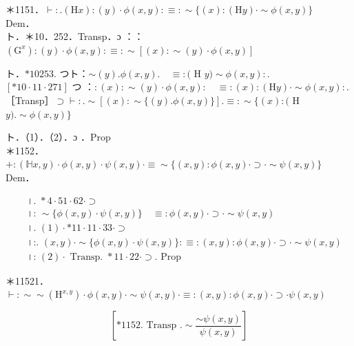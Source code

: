 \documentclass[10pt]{article}
\begin{document}
＊1151．$\vdash: .(\mathrm{H} x):(y) \cdot \phi(x, y): \equiv: \sim\{(x):(\mathrm{H} y) \cdot \sim \phi(x, y)\}$\\
Dem．\\
ト．＊10．252．Transp．ɔ ：：$\left(\mathrm{G}^{x}\right):(y) \cdot \phi(x, y): \equiv: \sim[(x): \sim(y) \cdot \phi(x, y)]$

ト．$* 10253$. つト：$\sim(y) . \phi(x, y) . \quad \equiv:($ H $y) \sim \phi(x, y):$.\\
$[* 10 \cdot 11 \cdot 271]$ つ ：$:(x): \sim(y) \cdot \phi(x, y): \quad \equiv:(x):(\mathrm{H} y) \cdot \sim \phi(x, y):$.\\
［Transp］$\supset \vdash: . \sim[(x): \sim\{(y) . \phi(x, y)\}] . \equiv: \sim\{(x):($ H $y) . \sim \phi(x, y)\}$

ト．（1）．（2）．ɔ ．Prop\\
＊1152．$+:(\mathbb{H} x, y) \cdot \phi(x, y) \cdot \psi(x, y) \cdot \equiv \sim\{(x, y): \phi(x, y) \cdot \supset \cdot \sim \psi(x, y)\}$\\
Dem．


\begin{align*}
& \text { ।. } * 4 \cdot 51 \cdot 62 \cdot \supset \\
& \text { ।: } \sim\{\phi(x, y) \cdot \psi(x, y)\} \quad \equiv: \phi(x, y) \cdot \supset \cdot \sim \psi(x, y)  \tag{1}\\
& \text { ।. }(1) \cdot * 11 \cdot 11 \cdot 33 \cdot \supset \\
& \text { ।:. }(x, y) \cdot \sim\{\phi(x, y) \cdot \psi(x, y)\}: \equiv:(x, y): \phi(x, y) \cdot \supset \cdot \sim \psi(x, y)  \tag{2}\\
& \text { ।: }(2) \cdot \text { Transp. } * 11 \cdot 22 \cdot \supset \text {. Prop }
\end{align*}


＊11521．$\vdash: \sim \sim\left(\mathrm{H}^{x, y}\right) \cdot \phi(x, y) \cdot \sim \psi(x, y) \cdot \equiv:(x, y): \phi(x, y) \cdot \supset \cdot \psi(x, y)$

$$
\left[* 1152 . \text { Transp } . \sim \frac{\sim \psi(x, y)}{\psi(x, y)}\right]
$$
\end{document}
